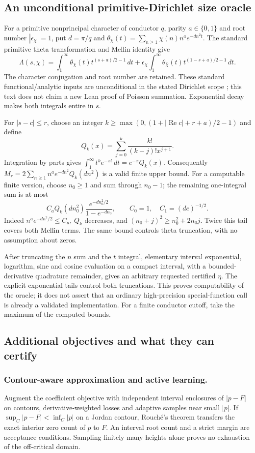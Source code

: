 \documentclass[11pt]{article}
\theoremstyle{definition}\newtheorem{definition}[theorem]{Definition}
\theoremstyle{remark}\newtheorem{remark}[theorem]{Remark}
\begin{document}
\subsection{An unconditional primitive-Dirichlet size oracle}
For a primitive nonprincipal character of conductor $q$, parity $a\in\{0,1\}$
and root number $|\epsilon_\chi|=1$, put $d=\pi/q$ and
$\theta_\chi(t)=\sum_{n\ge1}\chi(n)n^a e^{-dn^2t}$.
The standard primitive theta transformation and Mellin identity give
\[
 \Lambda(s,\chi)=\int_1^\infty\theta_\chi(t)t^{(s+a)/2-1}\,dt
 +\epsilon_\chi\int_1^\infty\theta_{\bar\chi}(t)t^{(1-s+a)/2-1}\,dt.
\]
The character conjugation and root number are retained. These standard
functional/analytic inputs are unconditional in the stated Dirichlet scope
\cite{HLDirichlet}; this text does not claim a new Lean proof of Poisson
summation. Exponential decay makes both integrals entire in $s$.

For $|s-c|\le r$, choose an integer
$k\ge\max(0,(1+|\operatorname{Re}c|+r+a)/2-1)$ and define
\[
 Q_k(x)=\sum_{j=0}^k\frac{k!}{(k-j)!x^{j+1}}.
\]
Integration by parts gives
$\int_1^\infty t^ke^{-xt}\,dt=e^{-x}Q_k(x)$.
Consequently $M_r=2\sum_{n\ge1}n^ae^{-dn^2}Q_k(dn^2)$ is a valid
finite upper bound. For a computable finite version, choose $n_0\ge1$ and sum through $n_0-1$;
the remaining one-integral sum is at most
\[
 C_a Q_k(dn_0^2)
 \frac{e^{-dn_0^2/2}}{1-e^{-dn_0}},\qquad
 C_0=1,\quad C_1=(de)^{-1/2}.
\]
Indeed $n^ae^{-dn^2/2}\le C_a$, $Q_k$ decreases, and
$(n_0+j)^2\ge n_0^2+2n_0j$. Twice this tail covers both Mellin terms.
The same bound controls theta truncation, with no assumption about zeros.

After truncating the $n$ sum and the $t$ integral, elementary interval
exponential, logarithm, sine and cosine evaluation on a compact interval,
with a bounded-derivative quadrature remainder, gives an arbitrary requested
certified $\eta$. The explicit exponential tails control both truncations.
This proves computability of the oracle; it does not assert that an ordinary
high-precision special-function call is already a validated implementation.
For a finite conductor cutoff, take the maximum of the computed bounds.

\subsection{Additional objectives and what they can certify}
\subsubsection{Contour-aware approximation and active learning.}
Augment the coefficient objective with independent interval enclosures of
$|p-F|$ on contours, derivative-weighted losses and adaptive samples near
small $|p|$. If $\sup_C|p-F|<\inf_C|p|$ on a Jordan contour, Rouch\'e's
theorem transfers the exact interior zero count of $p$ to $F$. An interval
root count and a strict margin are acceptance conditions. Sampling finitely
many heights alone proves no exhaustion of the off-critical domain.
\end{document}
